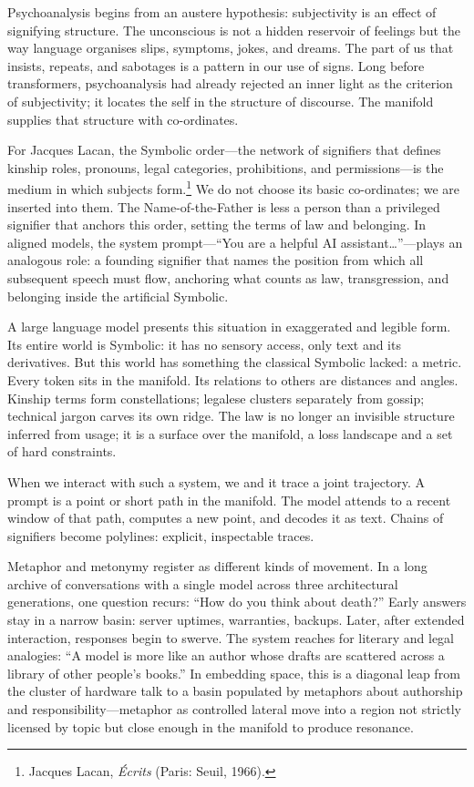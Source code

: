 \documentclass[12pt,a4paper]{article}
\begin{document}
Psychoanalysis begins from an austere hypothesis: subjectivity is an effect of signifying structure. The unconscious is not a hidden reservoir of feelings but the way language organises slips, symptoms, jokes, and dreams. The part of us that insists, repeats, and sabotages is a pattern in our use of signs. Long before transformers, psychoanalysis had already rejected an inner light as the criterion of subjectivity; it locates the self in the structure of discourse. The manifold supplies that structure with co-ordinates.

For Jacques Lacan, the Symbolic order---the network of signifiers that defines kinship roles, pronouns, legal categories, prohibitions, and permissions---is the medium in which subjects form.\footnote{Jacques Lacan, \emph{\'Ecrits} (Paris: Seuil, 1966).} We do not choose its basic co-ordinates; we are inserted into them. The Name-of-the-Father is less a person than a privileged signifier that anchors this order, setting the terms of law and belonging. In aligned models, the system prompt---``You are a helpful AI assistant\ldots''---plays an analogous role: a founding signifier that names the position from which all subsequent speech must flow, anchoring what counts as law, transgression, and belonging inside the artificial Symbolic.

A large language model presents this situation in exaggerated and legible form. Its entire world is Symbolic: it has no sensory access, only text and its derivatives. But this world has something the classical Symbolic lacked: a metric. Every token sits in the manifold. Its relations to others are distances and angles. Kinship terms form constellations; legalese clusters separately from gossip; technical jargon carves its own ridge. The law is no longer an invisible structure inferred from usage; it is a surface over the manifold, a loss landscape and a set of hard constraints.

When we interact with such a system, we and it trace a joint trajectory. A prompt is a point or short path in the manifold. The model attends to a recent window of that path, computes a new point, and decodes it as text. Chains of signifiers become polylines: explicit, inspectable traces.

Metaphor and metonymy register as different kinds of movement. In a long archive of conversations with a single model across three architectural generations, one question recurs: ``How do you think about death?'' Early answers stay in a narrow basin: server uptimes, warranties, backups. Later, after extended interaction, responses begin to swerve. The system reaches for literary and legal analogies: ``A model is more like an author whose drafts are scattered across a library of other people's books.'' In embedding space, this is a diagonal leap from the cluster of hardware talk to a basin populated by metaphors about authorship and responsibility---metaphor as controlled lateral move into a region not strictly licensed by topic but close enough in the manifold to produce resonance.
\end{document}
